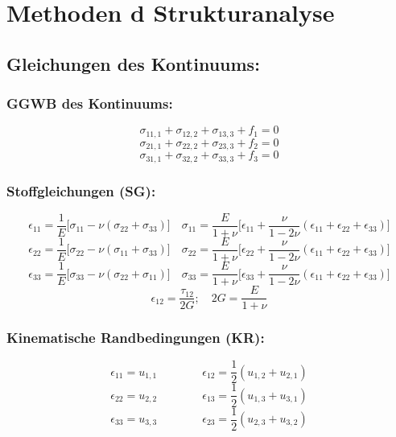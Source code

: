 \section{Methoden d Strukturanalyse}
    \subsection{Gleichungen des Kontinuums:}
        \subsubsection{GGWB des Kontinuums:}
            \small
            \[\sigma_{11,1} + \sigma_{12,2} + \sigma_{13,3} + f_1 = 0\]
            \[\sigma_{21,1} + \sigma_{22,2} + \sigma_{23,3} + f_2 = 0\]
            \[\sigma_{31,1} + \sigma_{32,2} + \sigma_{33,3} + f_3 = 0\]
            
        \subsubsection{Stoffgleichungen (SG):}
            \[\epsilon_{11} = \frac{1}{E}\lbrack\sigma_{11} - \nu(\sigma_{22} + \sigma_{33})\rbrack \quad \sigma_{11}=\frac{E}{1+\nu}\lbrack\epsilon_{11}+\frac{\nu}{1-2\nu}(\epsilon_{11}+\epsilon_{22}+\epsilon_{33})\rbrack\]
            \[\epsilon_{22} = \frac{1}{E}\lbrack\sigma_{22} - \nu(\sigma_{11} + \sigma_{33})\rbrack \quad \sigma_{22}=\frac{E}{1+\nu}\lbrack\epsilon_{22}+\frac{\nu}{1-2\nu}(\epsilon_{11}+\epsilon_{22}+\epsilon_{33})\rbrack\]
            \[\epsilon_{33} = \frac{1}{E}\lbrack\sigma_{33} - \nu(\sigma_{22} + \sigma_{11})\rbrack \quad \sigma_{33}=\frac{E}{1+\nu}\lbrack\epsilon_{33}+\frac{\nu}{1-2\nu}(\epsilon_{11}+\epsilon_{22}+\epsilon_{33})\rbrack\]
            \[\epsilon_{12}=\frac{\tau_{12}}{2G}; \quad 2G=\frac{E}{1+\nu}\]
            
        \subsubsection{Kinematische Randbedingungen (KR):}
            \[\epsilon_{11} = u_{1,1}\quad\quad\quad\quad\epsilon_{12} = \frac{1}{2}(u_{1,2} + u_{2,1})\]
            \[\epsilon_{22} = u_{2,2}\quad\quad\quad\quad\epsilon_{13} = \frac{1}{2}(u_{1,3} + u_{3,1})\]
            \[\epsilon_{33} = u_{3,3}\quad\quad\quad\quad\epsilon_{23} = \frac{1}{2}(u_{2,3} + u_{3,2})\]
            \normalsize
        
    